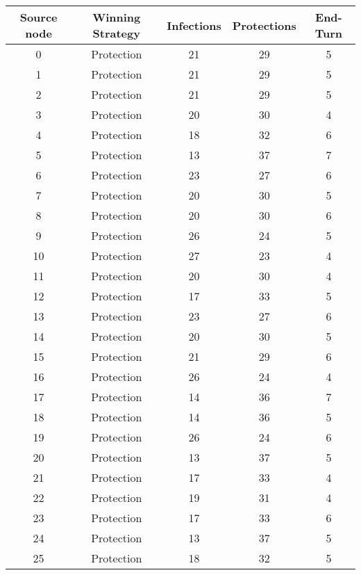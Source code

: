 \documentclass[results.tex]{subfiles}
\begin{document}
\begin{center}
  \begin{tabular}{| c || c | c | c | c |}
    \hline
    {\bfseries Source node} & {\bfseries Winning Strategy} & {\bfseries Infections} & {\bfseries Protections} & {\bfseries End-Turn} \\  %
    \hline\hline
    0 & Protection & 21 & 29 & 5 \\ 
    \hline
    1 & Protection & 21 & 29 & 5 \\ 
    \hline
    2 & Protection & 21 & 29 & 5 \\ 
    \hline
    3 & Protection & 20 & 30 & 4 \\ 
    \hline
    4 & Protection & 18 & 32 & 6 \\ 
    \hline
    5 & Protection & 13 & 37 & 7 \\ 
    \hline
    6 & Protection & 23 & 27 & 6 \\ 
    \hline
    7 & Protection & 20 & 30 & 5 \\ 
    \hline
    8 & Protection & 20 & 30 & 6 \\ 
    \hline
    9 & Protection & 26 & 24 & 5 \\ 
    \hline
    10 & Protection & 27 & 23 & 4 \\ 
    \hline
    11 & Protection & 20 & 30 & 4 \\ 
    \hline
    12 & Protection & 17 & 33 & 5 \\ 
    \hline
    13 & Protection & 23 & 27 & 6 \\ 
    \hline
    14 & Protection & 20 & 30 & 5 \\ 
    \hline
    15 & Protection & 21 & 29 & 6 \\ 
    \hline
    16 & Protection & 26 & 24 & 4 \\ 
    \hline
    17 & Protection & 14 & 36 & 7 \\ 
    \hline
    18 & Protection & 14 & 36 & 5 \\ 
    \hline
    19 & Protection & 26 & 24 & 6 \\ 
    \hline
    20 & Protection & 13 & 37 & 5 \\ 
    \hline
    21 & Protection & 17 & 33 & 4 \\ 
    \hline
    22 & Protection & 19 & 31 & 4 \\ 
    \hline
    23 & Protection & 17 & 33 & 6 \\ 
    \hline
    24 & Protection & 13 & 37 & 5 \\ 
    \hline
    25 & Protection & 18 & 32 & 5 \\ 

\end{tabular}
\end{center}
\end{document}
